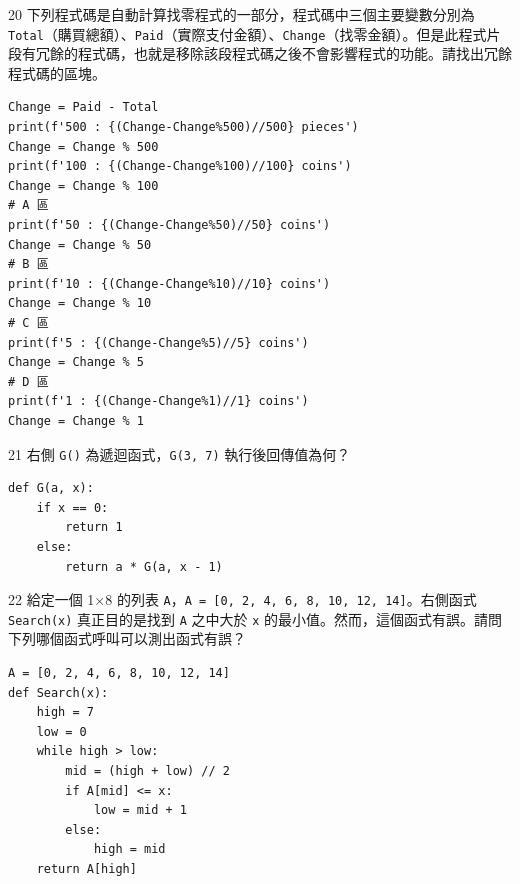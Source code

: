 \medskip

\begin{qbox}{20}
下列程式碼是自動計算找零程式的一部分，程式碼中三個主要變數分別為 \texttt{Total}（購買總額）、\texttt{Paid}（實際支付金額）、\texttt{Change}（找零金額）。但是此程式片段有冗餘的程式碼，也就是移除該段程式碼之後不會影響程式的功能。請找出冗餘程式碼的區塊。

\begin{verbatim}
Change = Paid - Total
print(f'500 : {(Change-Change%500)//500} pieces')
Change = Change % 500
print(f'100 : {(Change-Change%100)//100} coins')
Change = Change % 100
# A 區
print(f'50 : {(Change-Change%50)//50} coins')
Change = Change % 50
# B 區
print(f'10 : {(Change-Change%10)//10} coins')
Change = Change % 10
# C 區
print(f'5 : {(Change-Change%5)//5} coins')
Change = Change % 5
# D 區
print(f'1 : {(Change-Change%1)//1} coins')
Change = Change % 1
\end{verbatim}

\end{qbox}

\medskip

\begin{qbox}{21}
右側 \texttt{G()} 為遞迴函式，\texttt{G(3, 7)} 執行後回傳值為何？

\begin{verbatim}
def G(a, x):
    if x == 0:
        return 1
    else:
        return a * G(a, x - 1)
\end{verbatim}

\end{qbox}

\medskip

\begin{qbox}{22}
給定一個 1×8 的列表 \texttt{A}，\texttt{A = [0, 2, 4, 6, 8, 10, 12, 14]}。右側函式 \texttt{Search(x)} 真正目的是找到 \texttt{A} 之中大於 \texttt{x} 的最小值。然而，這個函式有誤。請問下列哪個函式呼叫可以測出函式有誤？

\begin{verbatim}
A = [0, 2, 4, 6, 8, 10, 12, 14]
def Search(x):
    high = 7
    low = 0
    while high > low:
        mid = (high + low) // 2
        if A[mid] <= x:
            low = mid + 1
        else:
            high = mid
    return A[high]
\end{verbatim}

\end{qbox}

